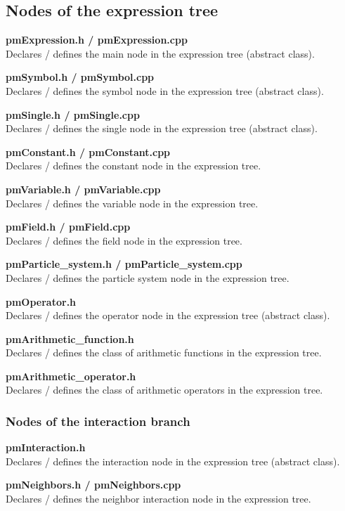 \documentclass[a4paper,12pt,openany]{book}
\theoremstyle{break}
\begin{document}
\subsection{Nodes of the expression tree}

\textbf{pmExpression.h / pmExpression.cpp} \\
Declares / defines the main node in the expression tree (abstract class).

\textbf{pmSymbol.h / pmSymbol.cpp} \\
Declares / defines the symbol node in the expression tree (abstract class).

\textbf{pmSingle.h / pmSingle.cpp} \\
Declares / defines the single node in the expression tree (abstract class).

\textbf{pmConstant.h / pmConstant.cpp} \\
Declares / defines the constant node in the expression tree.

\textbf{pmVariable.h / pmVariable.cpp} \\
Declares / defines the variable node in the expression tree.

\textbf{pmField.h / pmField.cpp} \\
Declares / defines the field node in the expression tree.

\textbf{pmParticle\_system.h / pmParticle\_system.cpp} \\
Declares / defines the particle system node in the expression tree.

\textbf{pmOperator.h} \\
Declares / defines the operator node in the expression tree (abstract class).

\textbf{pmArithmetic\_function.h} \\
Declares / defines the class of arithmetic functions in the expression tree.

\textbf{pmArithmetic\_operator.h} \\
Declares / defines the class of arithmetic operators in the expression tree.


\subsubsection{Nodes of the interaction branch}

\textbf{pmInteraction.h} \\
Declares / defines the interaction node in the expression tree (abstract class).

\textbf{pmNeighbors.h / pmNeighbors.cpp} \\
Declares / defines the neighbor interaction node in the expression tree.
\end{document}
